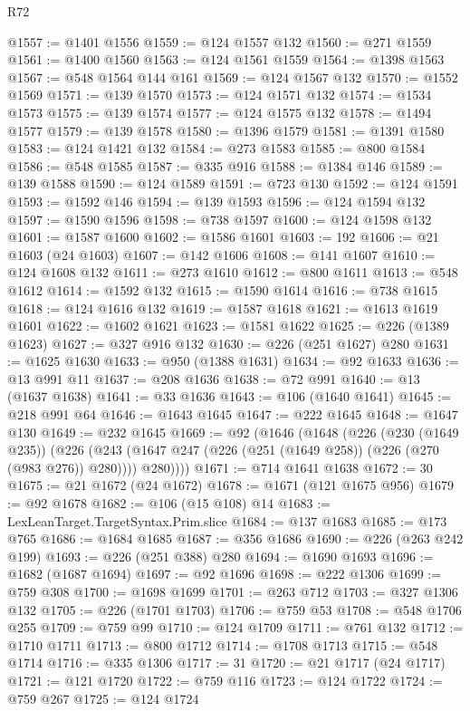\begin{lexlean}{R72}
\begin{coremodule}
@1557 := @1401 @1556
@1559 := @124 @1557 @132
@1560 := @271 @1559
@1561 := @1400 @1560
@1563 := @124 @1561 @1559
@1564 := @1398 @1563
@1567 := @548 @1564 @144 @161
@1569 := @124 @1567 @132
@1570 := @1552 @1569
@1571 := @139 @1570
@1573 := @124 @1571 @132
@1574 := @1534 @1573
@1575 := @139 @1574
@1577 := @124 @1575 @132
@1578 := @1494 @1577
@1579 := @139 @1578
@1580 := @1396 @1579
@1581 := @1391 @1580
@1583 := @124 @1421 @132
@1584 := @273 @1583
@1585 := @800 @1584
@1586 := @548 @1585
@1587 := @335 @916
@1588 := @1384 @146
@1589 := @139 @1588
@1590 := @124 @1589
@1591 := @723 @130
@1592 := @124 @1591
@1593 := @1592 @146
@1594 := @139 @1593
@1596 := @124 @1594 @132
@1597 := @1590 @1596
@1598 := @738 @1597
@1600 := @124 @1598 @132
@1601 := @1587 @1600
@1602 := @1586 @1601
@1603 := 192
@1606 := @21 @1603 (@24 @1603)
@1607 := @142 @1606
@1608 := @141 @1607
@1610 := @124 @1608 @132
@1611 := @273 @1610
@1612 := @800 @1611
@1613 := @548 @1612
@1614 := @1592 @132
@1615 := @1590 @1614
@1616 := @738 @1615
@1618 := @124 @1616 @132
@1619 := @1587 @1618
@1621 := @1613 @1619 @1601
@1622 := @1602 @1621
@1623 := @1581 @1622
@1625 := @226 (@1389 @1623)
@1627 := @327 @916 @132
@1630 := @226 (@251 @1627) @280
@1631 := @1625 @1630
@1633 := @950 (@1388 @1631)
@1634 := @92 @1633
@1636 := @13 @991 @11
@1637 := @208 @1636
@1638 := @72 @991
@1640 := @13 (@1637 @1638)
@1641 := @33 @1636
@1643 := @106 (@1640 @1641)
@1645 := @218 @991 @64
@1646 := @1643 @1645
@1647 := @222 @1645
@1648 := @1647 @130
@1649 := @232 @1645
@1669 := @92
    (@1646
      (@1648
        (@226
          (@230 (@1649 @235))
          (@226
            (@243 (@1647 @247 (@226 (@251 (@1649 @258)) (@226 (@270 (@983 @276)) @280))))
            @280))))
@1671 := @714 @1641 @1638
@1672 := 30
@1675 := @21 @1672 (@24 @1672)
@1678 := @1671 (@121 @1675 @956)
@1679 := @92 @1678
@1682 := @106 (@15 @108) @14
@1683 := LexLeanTarget.TargetSyntax.Prim.slice
@1684 := @137 @1683
@1685 := @173 @765
@1686 := @1684 @1685
@1687 := @356 @1686
@1690 := @226 (@263 @242 @199)
@1693 := @226 (@251 @388) @280
@1694 := @1690 @1693
@1696 := @1682 (@1687 @1694)
@1697 := @92 @1696
@1698 := @222 @1306
@1699 := @759 @308
@1700 := @1698 @1699
@1701 := @263 @712
@1703 := @327 @1306 @132
@1705 := @226 (@1701 @1703)
@1706 := @759 @53
@1708 := @548 @1706 @255
@1709 := @759 @99
@1710 := @124 @1709
@1711 := @761 @132
@1712 := @1710 @1711
@1713 := @800 @1712
@1714 := @1708 @1713
@1715 := @548 @1714
@1716 := @335 @1306
@1717 := 31
@1720 := @21 @1717 (@24 @1717)
@1721 := @121 @1720
@1722 := @759 @116
@1723 := @124 @1722
@1724 := @759 @267
@1725 := @124 @1724

\end{coremodule}
\end{lexlean}
